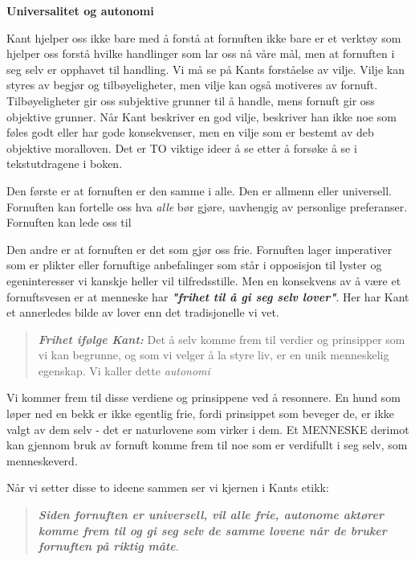 \documentclass[11pt, a4paper]{article}
\newenvironment{sectionbox}[1][]{%
    \begin{sectionboxinner}
    \textbf{\large #1}
    \vspace{1pt}
    \newline
}{%
    \end{sectionboxinner}
}
\begin{document}
\begin{sectionbox}[Universalitet og autonomi]
    \begin{flushleft}
        Kant hjelper oss ikke bare med å forstå at fornuften ikke bare er et verktøy som hjelper oss forstå hvilke handlinger som lar oss nå våre mål, men at fornuften i seg selv er opphavet til handling. Vi må se på Kants forståelse av vilje. Vilje kan styres av begjør og tilbøyeligheter, men vilje kan også motiveres av fornuft. Tilbøyeligheter gir oss subjektive grunner til å handle, mens fornuft gir oss objektive grunner. Når Kant beskriver en god vilje, beskriver han ikke noe som føles godt eller har gode konsekvenser, men en vilje som er bestemt av deb objektive moralloven. Det er TO viktige ideer å se etter å forsøke å se i tekstutdragene i boken.\newline
    
        Den første er at fornuften er den samme i alle. Den er allmenn eller universell. Fornuften kan fortelle oss hva \textit{alle} bør gjøre, uavhengig av personlige preferanser. Fornuften kan lede oss til \newline
    
        Den andre er at fornuften er det som gjør oss frie. Fornuften lager imperativer som er plikter eller fornuftige anbefalinger som står i opposisjon til lyster og egeninteresser vi kanskje heller vil tilfredsstille. Men en konsekvens av å være et fornuftsvesen er at menneske har \textbf{\textit{"frihet til å gi seg selv lover"}}. Her har Kant et annerledes bilde av lover enn det tradisjonelle vi vet. 

        \begin{quote}
            \textbf{\textit{Frihet ifølge Kant:}} Det å selv komme frem til verdier og prinsipper som vi kan begrunne, og som vi velger å la styre liv, er en unik menneskelig egenskap. Vi kaller dette \textit{autonomi}
        \end{quote}

        Vi kommer frem til disse verdiene og prinsippene ved å resonnere. En hund som løper ned en bekk er ikke egentlig frie, fordi prinsippet som beveger de, er ikke valgt av dem selv - det er naturlovene som virker i dem. Et MENNESKE derimot kan gjennom bruk av fornuft komme frem til noe som er verdifullt i seg selv, som menneskeverd.\newline

        Når vi setter disse to ideene sammen ser vi kjernen i Kants etikk: 
        \begin{quote}
            \textbf{\textit{Siden fornuften er universell, vil alle frie, autonome aktører komme frem til og gi seg selv de samme lovene når de bruker fornuften på riktig måte}}. 
        \end{quote}
    \end{flushleft}



\end{sectionbox}
\end{document}
